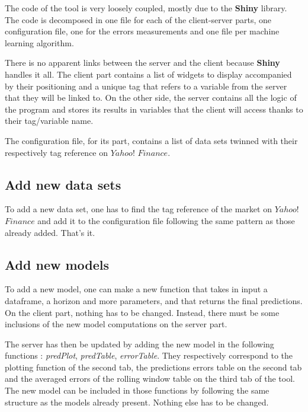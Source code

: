\documentclass[11pt,a4paper,oneside]{book}
\begin{document}
The code of the tool is very loosely coupled, mostly due to the \textbf{Shiny} library. The code is decomposed in one file for each of the client-server parts, one configuration file, one for the errors measurements and one file per machine learning algorithm. 

There is no apparent links between the server and the client because \textbf{Shiny} handles it all. The client part contains a list of widgets to display accompanied by their positioning and a unique tag that refers to a variable from the server that they will be linked to. On the other side, the server contains all the logic of the program and stores its results in variables that the client will access thanks to their tag/variable name.

The configuration file, for its part, contains a list of data sets twinned with their respectively tag reference on $Yahoo!$ $Finance$. 


\subsection{Add new data sets}

To add a new data set, one has to find the tag reference of the market on $Yahoo!$ $Finance$ and add it to the configuration file following the same pattern as those already added. That's it.


\subsection{Add new models}

To add a new model, one can make a new function that takes in input a dataframe, a horizon and more parameters, and that returns the final predictions. On the client part, nothing has to be changed. Instead, there must be some inclusions of the new model computations on the server part.

The server has then be updated by adding the new model in the following functions : \textit{predPlot}, \textit{predTable}, \textit{errorTable}. They respectively correspond to the plotting function of the second tab, the predictions errors table on the second tab and the averaged errors of the rolling window table on the third tab of the tool. The new model can be included in those functions by following the same structure as the models already present. Nothing else has to be changed.
\end{document}
